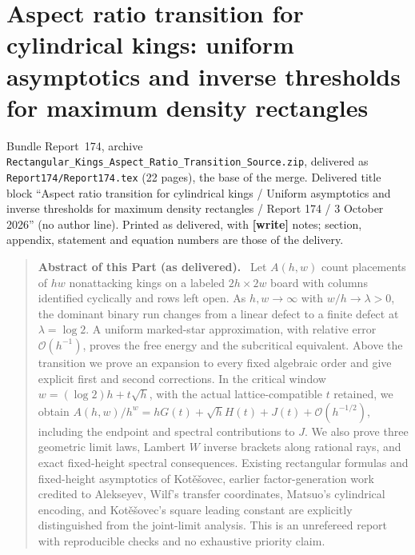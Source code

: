 \documentclass[11pt,letterpaper]{article}
\numberwithin{equation}{section}
\theoremstyle{remark}\newtheorem{remark}[theorem]{Remark}
\newcommand{\Oh}{\mathcal O}\newcommand{\Q}{\mathbb Q}\newcommand{\N}{\mathbb N}\newcommand{\R}{\mathbb R}
\newcommand{\file}[1]{\nolinkurl{#1}}
\newenvironment{partabstract}{\begin{quote}\small\noindent\textbf{Abstract of this Part (as delivered).}\ }{\end{quote}}
\newcommand{\partsource}[1]{\par\noindent\begin{minipage}{\textwidth}\small #1\end{minipage}\par\medskip}
\begin{document}
\part{Aspect ratio transition for cylindrical kings: uniform asymptotics and inverse thresholds for maximum density rectangles}\label{mdk:asp:part}
\partsource{Bundle Report~174, archive \file{Rectangular_Kings_Aspect_Ratio_Transition_Source.zip}, delivered as \file{Report174/Report174.tex} (22 pages), the base of the merge. Delivered title block ``Aspect ratio transition for cylindrical kings / Uniform asymptotics and inverse thresholds for maximum density rectangles / Report 174 / 3 October 2026'' (no author line). Printed as delivered, with \textbf{[write]} notes; section, appendix, statement and equation numbers are those of the delivery.}
\begin{partabstract}
Let $A(h,w)$ count placements of $hw$ nonattacking kings on a labeled $2h\times2w$ board with columns identified cyclically and rows left open. As $h,w\to\infty$ with $w/h\to\lambda>0$, the dominant binary run changes from a linear defect to a finite defect at $\lambda=\log2$. A uniform marked-star approximation, with relative error $\Oh(h^{-1})$, proves the free energy and the subcritical equivalent. Above the transition we prove an expansion to every fixed algebraic order and give explicit first and second corrections. In the critical window $w=(\log2)h+t\sqrt h$, with the actual lattice-compatible $t$ retained, we obtain $A(h,w)/h^w=hG(t)+\sqrt h H(t)+J(t)+\Oh(h^{-1/2})$, including the endpoint and spectral contributions to $J$. We also prove three geometric limit laws, Lambert $W$ inverse brackets along rational rays, and exact fixed-height spectral consequences. Existing rectangular formulas and fixed-height asymptotics of Kot\v{e}\v{s}ovec, earlier factor-generation work credited to Alekseyev, Wilf's transfer coordinates, Matsuo's cylindrical encoding, and Kot\v{e}\v{s}ovec's square leading constant are explicitly distinguished from the joint-limit analysis. This is an unrefereed report with reproducible checks and no exhaustive priority claim.
\end{partabstract}
\end{document}
